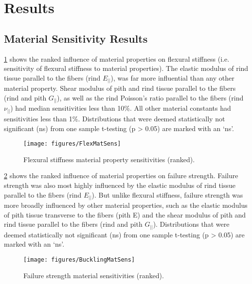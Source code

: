 \section{Results}
\label{sec:ch4_results}

\subsection{Material Sensitivity Results}
\label{ssec:material_sensitivity_results}
\cref{fig:FlexMatSens} shows the ranked influence of material properties on flexural stiffness (i.e. sensitivity of flexural stiffness to material properties). The elastic modulus of rind tissue parallel to the fibers (rind ${E_{||}}$), was far more influential than any other material property. Shear modulus of pith and rind tissue parallel to the fibers (rind and pith ${G_{||}}$), as well as the rind Poisson’s ratio parallel to the fibers (rind ${\nu_{||}}$) had median sensitivities less than 10\%. All other material constants had sensitivities less than 1\%. Distributions that were deemed statistically not significant (ns) from one sample t-testing (p > 0.05) are marked with an ‘ns’. \newline

\begin{figure}[htbp]
	\centering
	\texttt{[image: figures/FlexMatSens]}
	\caption[Flexural stiffness material property sensitivities.]{Flexural stiffness material property sensitivities (ranked).}
	\label{fig:FlexMatSens}
\end{figure}

\cref{fig:BucklingMatSens} shows the ranked influence of material properties on failure strength. Failure strength was also most highly influenced by the elastic modulus of rind tissue parallel to the fibers (rind ${E_{||}}$). But unlike flexural stiffness, failure strength was more broadly influenced by other material properties, such as the elastic modulus of pith tissue transverse to the fibers (pith E) and the shear modulus of pith and rind tissue parallel to the fibers (rind and pith ${G_{||}}$). Distributions that were deemed statistically not significant (ns) from one sample t-testing (p > 0.05) are marked with an ‘ns’.

\begin{figure}[htbp]
	\centering
	\texttt{[image: figures/BucklingMatSens]}
	\caption[Failure strength material sensitivities.]{Failure strength material sensitivities (ranked).}
	\label{fig:BucklingMatSens}
\end{figure}

